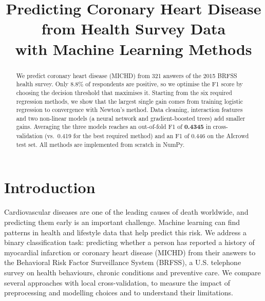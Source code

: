 \documentclass[10pt,conference,compsocconf]{IEEEtran}
\begin{document}
\title{Predicting Coronary Heart Disease from Health Survey Data\\with Machine Learning Methods}

\author{
  \and
}

\maketitle
\vspace{-4mm}

\begin{abstract}
We predict coronary heart disease (MICHD) from 321 answers of the 2015 BRFSS health survey.
Only 8.8\% of respondents are positive, so we optimise the F1 score by choosing the decision threshold that maximises it.
Starting from the six required regression methods, we show that the largest single gain comes from training logistic regression to convergence with Newton's method.
Data cleaning, interaction features and two non-linear models (a neural network and gradient-boosted trees) add smaller gains.
Averaging the three models reaches an out-of-fold F1 of \textbf{0.4345} in cross-validation (vs.\ 0.419 for the best required method) and an F1 of 0.446 on the AIcrowd test set.
All methods are implemented from scratch in NumPy.
\end{abstract}

\section{Introduction}
Cardiovascular diseases are one of the leading causes of death worldwide, and predicting them early is an important challenge.
Machine learning can find patterns in health and lifestyle data that help predict this risk.
We address a binary classification task: predicting whether a person has reported a history of myocardial infarction or coronary heart disease (MICHD) from their answers to the Behavioral Risk Factor Surveillance System (BRFSS), a U.S. telephone survey on health behaviours, chronic conditions and preventive care.
We compare several approaches with local cross-validation, to measure the impact of preprocessing and modelling choices and to understand their limitations.
\end{document}
